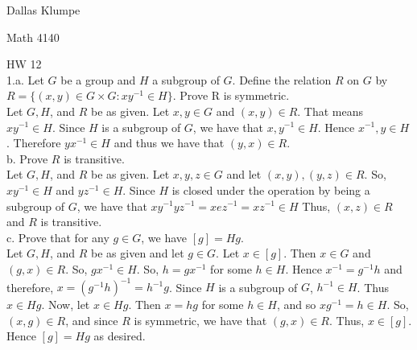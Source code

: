 \documentclass[12pt]{article}
\begin{document}
\noindent Dallas Klumpe

\noindent Math 4140

\noindent HW 12\\

1.a. Let $G$ be a group and $H$ a subgroup of $G$. Define the relation $R$ on $G$ by $R=\{(x,y)\in G\times G:xy^{-1}\in H\}$. Prove R is symmetric.\\
Let $G, H$, and $R$ be as given. Let $x,y\in G$ and $(x,y)\in R$. That means $xy^{-1}\in H$. Since $H$ is a subgroup of $G$, we have that $x,y^{-1}\in H$. Hence $x^{-1},y\in H$. Therefore $yx^{-1}\in H$ and thus we have that $(y,x)\in R$.\\
b. Prove $R$ is transitive.\\
Let $G, H$, and $R$ be as given. Let $x,y,z\in G$ and let $(x,y),(y,z)\in R$. So, $xy^{-1}\in H$ and $yz^{-1}\in H$. Since $H$ is closed under the operation by being a subgroup of $G$, we have that $xy^{-1}yz^{-1}=xez^{-1}=xz^{-1}\in H$ Thus, $(x,z)\in R$ and $R$ is transitive.\\
c. Prove that for any $g\in G$, we have $[g]=Hg$.\\
Let $G, H$, and $R$ be as given and let $g\in G$. Let $x\in [g]$. Then $x\in G$ and $(g,x)\in R$. So, $gx^{-1}\in H$. So, $h=gx^{-1}$ for some $h\in H$. Hence $x^{-1}=g^{-1}h$ and therefore, $x=(g^{-1}h)^{-1}=h^{-1}g$. Since $H$ is a subgroup of $G$, $h^{-1}\in H$. Thus $x\in Hg$. Now, let $x\in Hg$. Then $x=hg$ for some $h\in H$, and so $xg^{-1}=h\in H$. So, $(x,g)\in R$, and since $R$ is symmetric, we have that $(g,x)\in R$. Thus, $x\in [g]$. Hence $[g]=Hg$ as desired.\\[20pt]
\end{document}
